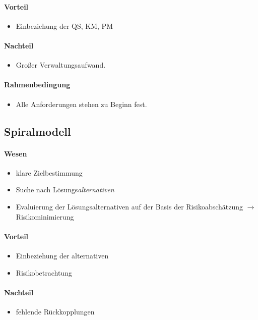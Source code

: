\documentclass{scrreprt}
\begin{document}
\paragraph{Vorteil}
\begin{itemize}
\item Einbeziehung der QS, KM, PM 
\end{itemize}

\paragraph{Nachteil}
\begin{itemize}
\item Großer Verwaltungsaufwand. 
\end{itemize}

\paragraph{Rahmenbedingung}
\begin{itemize}
\item Alle Anforderungen stehen zu Beginn fest.
\end{itemize}

\subsection{Spiralmodell}
\paragraph{Wesen} 
\begin{itemize}
\item klare Zielbestimmung
\item Suche nach Lösungs\emph{alternativen}
\item Evaluierung der Lösungsalternativen auf der Basis der Risikoabschätzung $\to $ Risikominimierung
\end{itemize}

\paragraph{Vorteil}
\begin{itemize}
\item Einbeziehung der alternativen
\item Risikobetrachtung
\end{itemize}

\paragraph{Nachteil}
\begin{itemize}
\item fehlende Rückkopplungen
\end{itemize}
\end{document}
